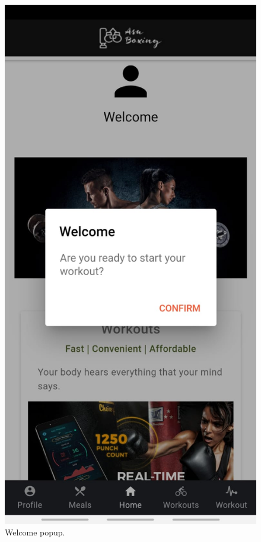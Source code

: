 \documentclass[a4paper,12pt]{report}
\begin{document}
\begin{figure}[ht] 
  \label{ fig7} 
  \begin{minipage}[b]{0.5\linewidth}
    \centering
    \includegraphics[width=.7\linewidth]{images/aplicationImages/welcomePopUp.jpeg} 
    \caption{Welcome popup.} 
    \vspace{4ex}
  \end{minipage}%
  \begin{minipage}[b]{0.5\linewidth}
    \centering

\end{minipage}
\end{figure}
\end{document}
